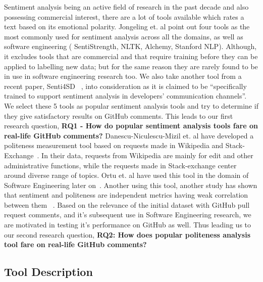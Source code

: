 Sentiment analysis being an active field of research in the past decade and also possessing commercial interest, there are a lot of tools available which rates a text based on its emotional polarity. Jongeling et. al point out four tools as the most commonly used for sentiment analysis across all the domains, as well as software engineering ( SentiStrength, NLTK, Alchemy, Stanford NLP). Although, it excludes tools that are commercial and that require training before they can be applied to labelling new data; but for the same reason they are rarely found to be in use in software engineering research too. We also take another tool from a recent paper, Senti4SD ~\cite{calefato2017sentiment}, into consideration as it is claimed to be “specifically trained to support sentiment analysis in developers’ communication channels”. We select these 5 tools as popular sentiment analysis tools and try to determine if they give satisfactory results on GitHub comments. This leads to our first research question,
\newline
\newline
\textbf{RQ1 - How do popular sentiment analysis tools fare on real-life GitHub comments?}
\newline
\newline
Danescu-Niculescu-Mizil et. al have developed a politeness measurement tool based on requests made in Wikipedia and Stack-Exchange~\cite{danescu2013computational}. In their data, requests from Wikipedia are mainly for edit and other administrative functions, while the requests made in Stack-exchange center around diverse range of topics. Ortu et. al have used this tool in the domain of Software Engineering later on~\cite{ortu2015would}. Another using this tool, another study has shown that sentiment and politeness are independent metrics having weak correlation between them ~\cite{ortu2015bullies}. Based on the relevance of the initial dataset with GitHub pull request comments, and it’s subsequent use in Software Engineering research, we are motivated in testing it’s performance on GitHub as well. Thus leading us to our second research question,
\newline
\newline
\textbf{RQ2: How does popular politeness analysis tool fare on real-life GitHub comments? }
\newline
\newline
\subsection{Tool Description}

